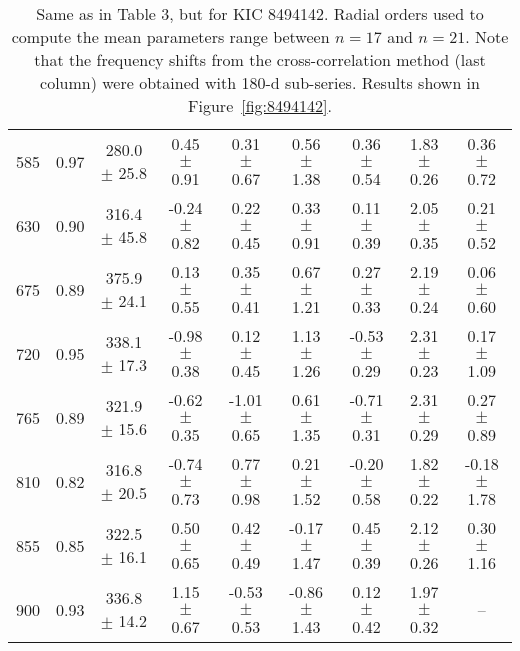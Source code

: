 \documentclass[twocolumn]{aastex61}%
\begin{document}
\begin{table*}[ht]
\begin{tabular}{ccc|ccccc|c}
585 & 0.97 & 280.0 $\pm$ 25.8 & 0.45 $\pm$ 0.91 & 0.31 $\pm$ 0.67 & 0.56 $\pm$ 1.38 & 0.36 $\pm$ 0.54 & 1.83 $\pm$ 0.26 & 0.36 $\pm$ 0.72\\
630 & 0.90 & 316.4 $\pm$ 45.8 & -0.24 $\pm$ 0.82 & 0.22 $\pm$ 0.45 & 0.33 $\pm$ 0.91 & 0.11 $\pm$ 0.39 & 2.05 $\pm$ 0.35 & 0.21 $\pm$ 0.52\\
675 & 0.89 & 375.9 $\pm$ 24.1 & 0.13 $\pm$ 0.55 & 0.35 $\pm$ 0.41 & 0.67 $\pm$ 1.21 & 0.27 $\pm$ 0.33 & 2.19 $\pm$ 0.24 & 0.06 $\pm$ 0.60\\
720 & 0.95 & 338.1 $\pm$ 17.3 & -0.98 $\pm$ 0.38 & 0.12 $\pm$ 0.45 & 1.13 $\pm$ 1.26 & -0.53 $\pm$ 0.29 & 2.31 $\pm$ 0.23 & 0.17 $\pm$ 1.09\\
765 & 0.89 & 321.9 $\pm$ 15.6 & -0.62 $\pm$ 0.35 & -1.01 $\pm$ 0.65 & 0.61 $\pm$ 1.35 & -0.71 $\pm$ 0.31 & 2.31 $\pm$ 0.29 & 0.27 $\pm$ 0.89\\
810 & 0.82 & 316.8 $\pm$ 20.5 & -0.74 $\pm$ 0.73 & 0.77 $\pm$ 0.98 & 0.21 $\pm$ 1.52 & -0.20 $\pm$ 0.58 & 1.82 $\pm$ 0.22 & -0.18 $\pm$ 1.78\\
855 & 0.85 & 322.5 $\pm$ 16.1 & 0.50 $\pm$ 0.65 & 0.42 $\pm$ 0.49 & -0.17 $\pm$ 1.47 & 0.45 $\pm$ 0.39 & 2.12 $\pm$ 0.26 & 0.30 $\pm$ 1.16\\
900 & 0.93 & 336.8 $\pm$ 14.2 & 1.15 $\pm$ 0.67 & -0.53 $\pm$ 0.53 & -0.86 $\pm$ 1.43 & 0.12 $\pm$ 0.42 & 1.97 $\pm$ 0.32 & --\\
\end{tabular}
\caption{Same as in Table 3, but for KIC 8494142. {Radial orders used to compute the mean parameters range between $n=17$ and $n=21$.} Note that the frequency shifts from the cross-correlation method (last column) were obtained with 180-d sub-series. Results shown in Figure~\ref{fig:8494142}.}\label{tab:8494142}\vspace{-1cm}
\end{table*}
\end{document}
